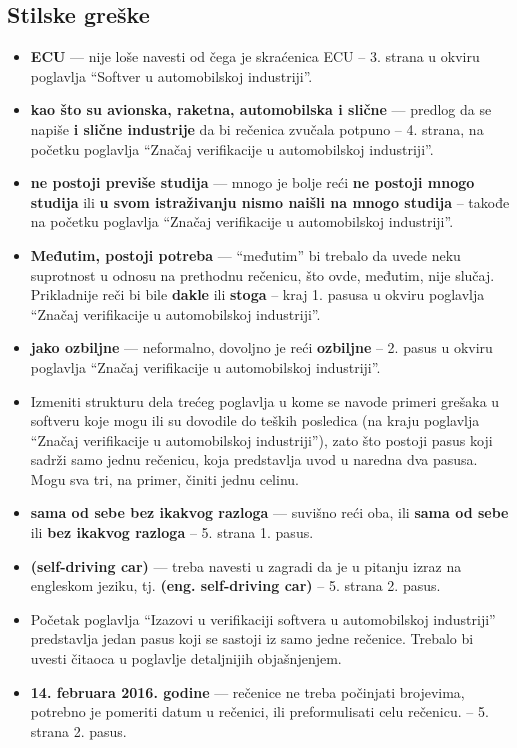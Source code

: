 \documentclass[a4paper]{report}
\begin{document}
\subsection{Stilske greške}

\begin{itemize}
\item{\bf{ECU}} --- nije loše navesti od čega je skraćenica ECU --
  3. strana u okviru poglavlja ``Softver u automobilskoj industriji''.
\item {\bf{kao što su avionska, raketna, automobilska i slične}} --- predlog da se napiše {\bf{i slične industrije}} da bi rečenica zvučala potpuno -- 4. strana, na početku poglavlja ``Značaj verifikacije u automobilskoj industriji''.
\item {\bf{ne postoji previše studija}} --- mnogo je bolje reći {\bf{ne postoji mnogo studija}} ili {\bf{u svom istraživanju nismo naišli na mnogo studija}} -- takođe na početku poglavlja ``Značaj verifikacije u automobilskoj industriji''.
\item {\bf{Međutim, postoji potreba}} --- ``međutim'' bi trebalo da uvede neku suprotnost u odnosu na prethodnu rečenicu, što ovde, međutim, nije slučaj. Prikladnije reči bi bile {\bf{dakle}} ili {\bf{stoga}} -- kraj 1. pasusa u okviru poglavlja ``Značaj verifikacije u automobilskoj industriji''.
\item {\bf{jako ozbiljne}} --- neformalno, dovoljno je reći {\bf{ozbiljne}} -- 2. pasus u okviru poglavlja ``Značaj verifikacije u automobilskoj industriji''.
\item Izmeniti strukturu dela trećeg poglavlja u kome se navode primeri grešaka u softveru koje mogu ili su dovodile do teških posledica (na kraju poglavlja ``Značaj verifikacije u automobilskoj industriji''), zato što postoji pasus koji sadrži samo jednu rečenicu, koja predstavlja uvod u naredna dva pasusa. Mogu sva tri, na primer, činiti jednu celinu.
\item {\bf{sama od sebe bez ikakvog razloga}} --- suvišno reći oba, ili {\bf{sama od sebe}} ili {\bf{bez ikakvog razloga}} -- 5. strana 1. pasus.
\item {\bf{(self-driving car)}} --- treba navesti u zagradi da je u pitanju izraz na engleskom jeziku, tj. {\bf{(eng. self-driving car)}} -- 5. strana 2. pasus.
\item Početak poglavlja ``Izazovi u verifikaciji softvera u automobilskoj industriji'' predstavlja jedan pasus koji se sastoji iz samo jedne rečenice. Trebalo bi uvesti čitaoca u poglavlje detaljnijih objašnjenjem.
\item {\bf{14. februara 2016. godine}} --- rečenice ne treba počinjati brojevima, potrebno je pomeriti datum u rečenici, ili preformulisati celu rečenicu. -- 5. strana 2. pasus.

\end{itemize}
\end{document}

